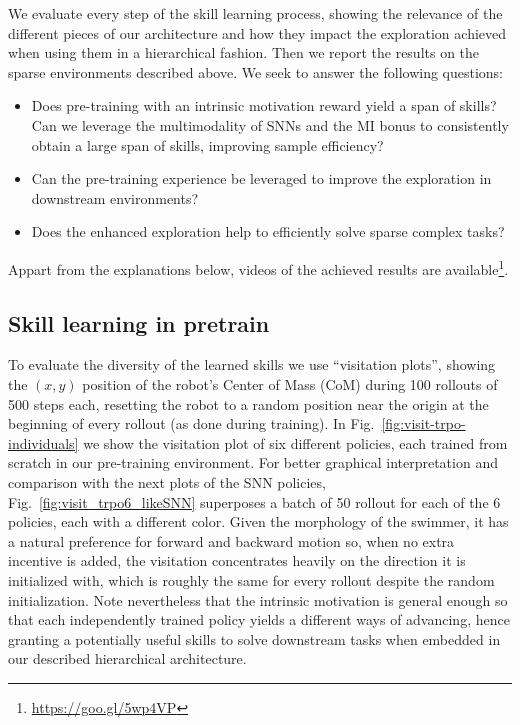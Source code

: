 \documentclass{article} %
\begin{document}
We evaluate every step of the skill learning process, showing the relevance of the different pieces of our architecture and how they impact the exploration achieved when using them in a hierarchical fashion. Then we report the results on the sparse environments described above. We seek to answer the following questions:
\begin{itemize}
    \item Does pre-training with an intrinsic motivation reward yield a span of skills? Can we leverage the multimodality of SNNs and the MI bonus to consistently obtain a large span of skills, improving sample efficiency? 
    \item Can the pre-training experience be leveraged to improve the exploration in downstream environments?
    \item Does the enhanced exploration help to efficiently solve sparse complex tasks?
\end{itemize}
Appart from the explanations below, videos of the achieved results are available\footnote{\url{https://goo.gl/5wp4VP}}.

\subsection{Skill learning in pretrain}

To evaluate the diversity of the learned skills we use ``visitation plots'', showing the $(x,y)$ position of the robot's Center of Mass (CoM) during 100 rollouts of 500 steps each, resetting the robot to a random position near the origin at the beginning of every rollout (as done during training). In Fig.\ \ref{fig:visit-trpo-individuals} we show the visitation plot of six different policies, each trained from scratch in our pre-training environment. For better graphical interpretation and comparison with the next plots of the SNN policies, Fig.\ \ref{fig:visit_trpo6_likeSNN} superposes a batch of 50 rollout for each of the 6 policies, each with a different color. Given the morphology of the swimmer, it has a natural preference for forward and backward motion so, when no extra incentive is added, the visitation concentrates heavily on the direction it is initialized with, which is roughly the same for every rollout despite the random initialization. Note nevertheless that the intrinsic motivation is general enough so that each independently trained policy yields a different ways of advancing, hence granting a potentially useful skills to solve downstream tasks when embedded in our described hierarchical architecture.
\end{document}
